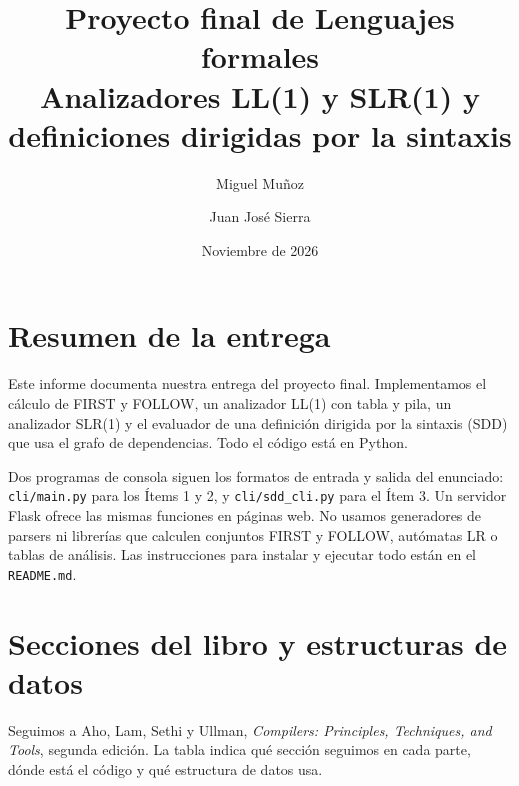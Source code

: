 \documentclass[11pt,a4paper]{article}
\title{Proyecto final de Lenguajes formales\\[4pt]\large Analizadores LL(1) y SLR(1) y definiciones dirigidas por la sintaxis}
\author{Miguel Muñoz \and Juan José Sierra}
\date{Noviembre de 2026}
\begin{document}
\maketitle

\section{Resumen de la entrega}
Este informe documenta nuestra entrega del proyecto final. Implementamos el cálculo de FIRST y FOLLOW, un analizador LL(1) con tabla y pila, un analizador SLR(1) y el evaluador de una definición dirigida por la sintaxis (SDD) que usa el grafo de dependencias. Todo el código está en Python.

Dos programas de consola siguen los formatos de entrada y salida del enunciado: \texttt{cli/main.py} para los Ítems 1 y 2, y \texttt{cli/sdd\_cli.py} para el Ítem 3. Un servidor Flask ofrece las mismas funciones en páginas web. No usamos generadores de parsers ni librerías que calculen conjuntos FIRST y FOLLOW, autómatas LR o tablas de análisis. Las instrucciones para instalar y ejecutar todo están en el \texttt{README.md}.

\section{Secciones del libro y estructuras de datos}
Seguimos a Aho, Lam, Sethi y Ullman, \emph{Compilers: Principles, Techniques, and Tools}, segunda edición. La tabla indica qué sección seguimos en cada parte, dónde está el código y qué estructura de datos usa.
\end{document}
